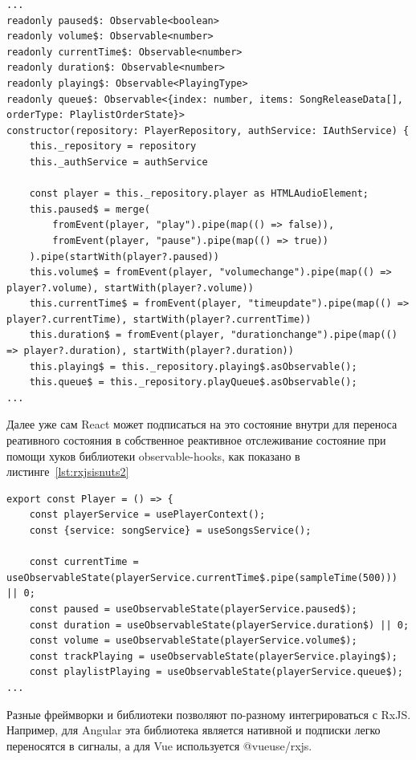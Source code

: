 \documentclass[14pt]{extarticle}
\begin{document}
\begin{lstlisting}[caption={Использование RxJS для обеспечения реактивного состояния}, label={lst:rxjsisnuts}]
...
readonly paused$: Observable<boolean>
readonly volume$: Observable<number>
readonly currentTime$: Observable<number>
readonly duration$: Observable<number>
readonly playing$: Observable<PlayingType>
readonly queue$: Observable<{index: number, items: SongReleaseData[], orderType: PlaylistOrderState}>
constructor(repository: PlayerRepository, authService: IAuthService) {
	this._repository = repository
	this._authService = authService

	const player = this._repository.player as HTMLAudioElement;
	this.paused$ = merge(
		fromEvent(player, "play").pipe(map(() => false)),
		fromEvent(player, "pause").pipe(map(() => true))
	).pipe(startWith(player?.paused))
	this.volume$ = fromEvent(player, "volumechange").pipe(map(() => player?.volume), startWith(player?.volume))
	this.currentTime$ = fromEvent(player, "timeupdate").pipe(map(() => player?.currentTime), startWith(player?.currentTime))
	this.duration$ = fromEvent(player, "durationchange").pipe(map(() => player?.duration), startWith(player?.duration))
	this.playing$ = this._repository.playing$.asObservable();
	this.queue$ = this._repository.playQueue$.asObservable();
...
\end{lstlisting}

Далее уже сам React может подписаться на это состояние внутри для переноса реативного состояния в собственное реактивное отслеживание
состояние при помощи хуков библиотеки observable-hooks, как показано в листинге~\ref{lst:rxjsisnuts2}

\begin{lstlisting}[caption={Перенос RxJS подписки в React в компонент плеера}, label={lst:rxjsisnuts2}]
export const Player = () => {
    const playerService = usePlayerContext();
    const {service: songService} = useSongsService();

    const currentTime = useObservableState(playerService.currentTime$.pipe(sampleTime(500))) || 0;
    const paused = useObservableState(playerService.paused$);
    const duration = useObservableState(playerService.duration$) || 0;
    const volume = useObservableState(playerService.volume$);
    const trackPlaying = useObservableState(playerService.playing$);
    const playlistPlaying = useObservableState(playerService.queue$);
...
\end{lstlisting}

Разные фреймворки и библиотеки позволяют по-разному интегрироваться с RxJS. Например, для Angular эта библиотека является нативной 
и подписки легко переносятся в сигналы, а для Vue используется @vueuse/rxjs.
\end{document}
